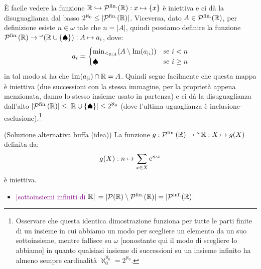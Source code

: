 \begin{soln}
	È facile vedere la funzione $\mathbb R \hookrightarrow \mathcal{P}^{\text{fin.}}(\mathbb R) : x \mapsto \{x\}$ è iniettiva e ci dà la disuguaglianza dal basso $2^{\aleph_0} \leq|\mathcal{P}^{\text{fin.}}(\mathbb R)|$. Viceversa, dato $A \in \mathcal{P}^{\text{fin.}}(\mathbb R)$, per definizione esiste $n \in \omega$ tale che $n = |A|$,
	quindi possiamo definire la funzione $\mathcal{P}^{\text{fin.}}(\mathbb R) \to {}^\omega(\mathbb R \cup \{\spadesuit\}) : A \mapsto a_i$, dove:
	\[ a_{i} = \begin{cases}
		\min_{<_{\mathbb R|A}}(A\setminus\operatorname{Im}(a_{|i}))&\text{se $i < n$} \\
		\spadesuit &\text{se $i \geq n$}
	\end{cases}
		\]
	in tal modo si ha che $\operatorname{Im}(a_{|i}) \cap \mathbb R = A$. Quindi segue facilmente che questa mappa è iniettiva (due successioni con la stessa immagine, per la proprietà appena menzionata, danno lo stesso insieme usato in partenza) e ci dà la disuguaglianza dall'alto 
	$|\mathcal{P}^{\text{fin.}}(\mathbb R)| \leq |\mathbb R \cup \{\spadesuit\}| \leq 2^{\aleph_0}$ (dove l'ultima uguaglianza è inclusione-esclusione).\footnote{Osservare che questa identica dimostrazione funziona per tutte le parti finite di un insieme in cui abbiamo un modo per scegliere un elemento da un suo sottoinsieme, mentre fallisce su $\omega$ [nonostante qui il modo di scegliere lo abbiamo] in 
	quanto qualsiasi insieme di successioni su un insieme infinito ha almeno sempre cardinalità $\aleph_0^{\aleph_0} = 2^{\aleph_0}$.}
\end{soln}

\begin{soln}
	(Soluzione alternativa buffa (idea))
	La funzione $g : \mathcal{P}^{\text{fin.}}(\mathbb R) \to {}^\omega\mathbb R : X \mapsto g(X)$ definita da:
	\[ g(X) : n \mapsto \sum_{x \in X} \text e^{n \cdot x}
		\]
	è iniettiva.
\end{soln}

\begin{itemize}
	\item \textcolor{purple}{$|$sottoinsiemi infiniti di $\mathbb R|$ $= |\mathcal{P}(\mathbb R)\setminus\mathcal{P}^{\text{fin.}}(\mathbb R)| = |\mathcal{P}^{\text{inf.}}(\mathbb R)|$}
\end{itemize}

